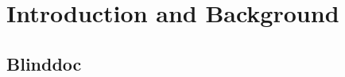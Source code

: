 \documentclass[\classfontsize,\papersize,twoside,showtrims,extrafontsizes]{memoir}  %
\begin{document}
\prefrontmatter

\cleartoevenpage

\cleartooddpage

\clearforchapter

\frontmatter





% 

\clearforchapter
\printglossary[title=Abbreviations, toctitle=Abbrevations, type=\acronymtype]
\clearforchapter
\tableofcontents*
\clearforchapter
\mylistoftodos

\mainmatter
\part[Introduction and Background]{Introduction and Background}
% 
% 
\chapter{Blinddoc}
\blinddocument
% 
% 


\appendix


\backmatter
\printbibliography
\end{document}
